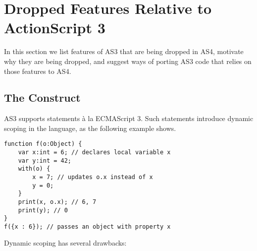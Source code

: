 



\section{Dropped Features Relative to ActionScript 3}
\label{dropped}
In this section we list features of AS3 that are being
dropped in AS4, motivate why they are being dropped, and suggest
ways of porting AS3 code that relies on those features to AS4.

\subsection{The  Construct}

AS3 supports  statements \`a la ECMAScript 3. Such
statements introduce dynamic scoping in the language, as the following example shows.

\begin{minipage}{\linewidth}
\begin{verbatim}
function f(o:Object) {
    var x:int = 6; // declares local variable x
    var y:int = 42;
    with(o) {
        x = 7; // updates o.x instead of x
        y = 0;
    }
    print(x, o.x); // 6, 7
    print(y); // 0
}
f({x : 6}); // passes an object with property x
\end{verbatim}
\end{minipage}

Dynamic scoping has several drawbacks:

